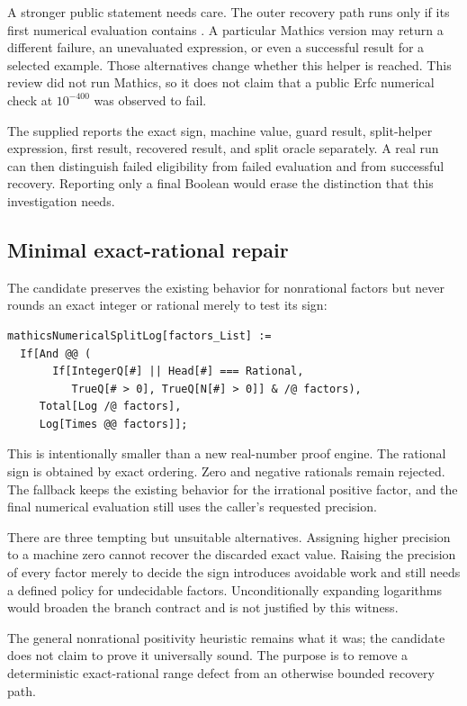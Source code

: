 \documentclass[11pt,letterpaper]{article}
\newcommand{\code}[1]{\texttt{\detokenize{#1}}}
\begin{document}
A stronger public statement needs care. The outer recovery path runs only if its first numerical evaluation contains \code{Indeterminate}. A particular Mathics version may return a different failure, an unevaluated expression, or even a successful result for a selected example. Those alternatives change whether this helper is reached. This review did not run Mathics, so it does not claim that a public Erfc numerical check at $10^{-400}$ was observed to fail.

The supplied \code{MathicsProbes.wl} reports the exact sign, machine value, guard result, split-helper expression, first \code{N} result, recovered \code{N} result, and split oracle separately. A real run can then distinguish failed eligibility from failed evaluation and from successful recovery. Reporting only a final Boolean would erase the distinction that this investigation needs.

\subsection{Minimal exact-rational repair}
The candidate preserves the existing behavior for nonrational factors but never rounds an exact integer or rational merely to test its sign:
\begin{lstlisting}
mathicsNumericalSplitLog[factors_List] :=
  If[And @@ (
       If[IntegerQ[#] || Head[#] === Rational,
          TrueQ[# > 0], TrueQ[N[#] > 0]] & /@ factors),
     Total[Log /@ factors],
     Log[Times @@ factors]];
\end{lstlisting}
This is intentionally smaller than a new real-number proof engine. The rational sign is obtained by exact ordering. Zero and negative rationals remain rejected. The fallback keeps the existing behavior for the irrational positive factor, and the final numerical evaluation still uses the caller's requested precision.~\cite{mathicsnum}

There are three tempting but unsuitable alternatives. Assigning higher precision to a machine zero cannot recover the discarded exact value. Raising the precision of every factor merely to decide the sign introduces avoidable work and still needs a defined policy for undecidable factors. Unconditionally expanding logarithms would broaden the branch contract and is not justified by this witness.

The general nonrational positivity heuristic remains what it was; the candidate does not claim to prove it universally sound. The purpose is to remove a deterministic exact-rational range defect from an otherwise bounded recovery path.
\end{document}
